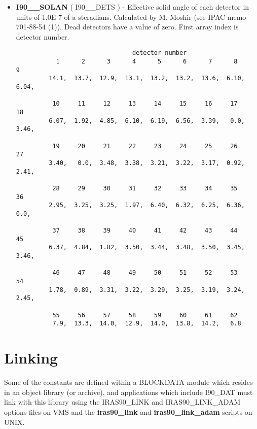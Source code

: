 \begin{itemize}
\item {\bf I90\_\_SOLAN} ( I90\_\_DETS ) -   Effective solid angle of each detector in
units of 1.0E-7 of a steradians. Calculated by M. Moshir (see IPAC memo
701-88-54 (1)). Dead detectors have a value of zero. First array index is detector number.

\begin{minipage}[t]{\textwidth}
\small
\begin{verbatim}
                                detector number
           1      2      3      4      5      6      7      8      9
         14.1,  13.7,  12.9,  13.1,  13.2,  13.2,  13.6,  6.10,  6.04,

          10     11     12     13     14     15     16     17     18
         6.07,  1.92,  4.85,  6.10,  6.19,  6.56,  3.39,   0.0,  3.46,

          19     20     21     22     23     24     25     26     27
         3.40,   0.0,  3.48,  3.38,  3.21,  3.22,  3.17,  0.92,  2.41,

          28     29     30     31     32     33     34     35     36
         2.95,  3.25,  3.25,  1.97,  6.40,  6.32,  6.25,  6.36,   0.0,

          37     38     39     40     41     42     43     44     45
         6.37,  4.84,  1.82,  3.50,  3.44,  3.48,  3.50,  3.45,  3.46,

          46     47     48     49     50     51     52     53     54
         1.78,  0.89,  3.31,  3.22,  3.29,  3.25,  3.19,  3.24,  2.45,

          55     56     57     58     59     60     61     62
          7.9,  13.3,  14.0,  12.9,  14.0,  13.8,  14.2,   6.8

\end{verbatim}
\normalsize
\end{minipage}
\end{itemize}
\section{Linking}

Some of the constants are defined within a BLOCKDATA module which resides in an
object library (or archive), and applications which include I90\_DAT must link
with this library using the IRAS90\_LINK and IRAS90\_LINK\_ADAM options files on
VMS and the {\bf iras90\_link} and {\bf iras90\_link\_adam} scripts on UNIX.


